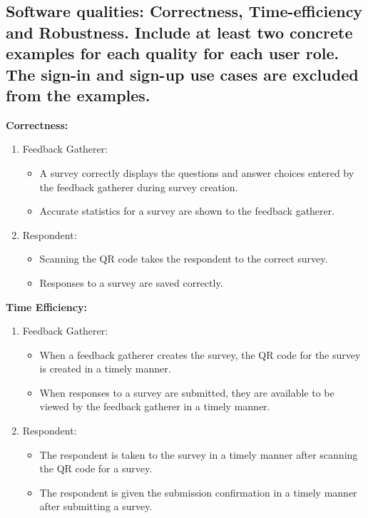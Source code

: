 \documentclass[letterpaper, 12 pt, conference]{ieeeconf}
\begin{document}
\subsection{Software qualities: Correctness, Time-eﬀiciency and Robustness. Include at least two concrete examples for each quality for each user role. The sign-in and sign-up use cases are excluded from the examples.}
\linebreak

\textbf{Correctness:}
\begin{enumerate}
    \item[] Feedback Gatherer:
    \begin{itemize}
        \item A survey correctly displays the questions and answer choices entered by the feedback gatherer during survey creation. 
        \item Accurate statistics for a survey are shown to the feedback gatherer.
    \end{itemize}
    \item[] Respondent:
    \begin{itemize}
        \item Scanning the QR code takes the respondent to the correct survey.
        \item Responses to a survey are saved correctly.
    \end{itemize}
\end{enumerate}
\hfill \break

\textbf{Time Efficiency:}
\begin{enumerate}
    \item[] Feedback Gatherer:
    \begin{itemize}
        \item  When a feedback gatherer creates the survey, the QR code for the survey is created in a timely manner.
        \item When responses to a survey are submitted, they are available to be viewed by the feedback gatherer in a timely manner.
    \end{itemize}
    \item[] Respondent:
    \begin{itemize}
        \item The respondent is taken to the survey in a timely manner after scanning the QR code for a survey.
        \item The respondent is given the submission confirmation in a timely manner after submitting a survey.
    \end{itemize}
\end{enumerate}
\end{document}
